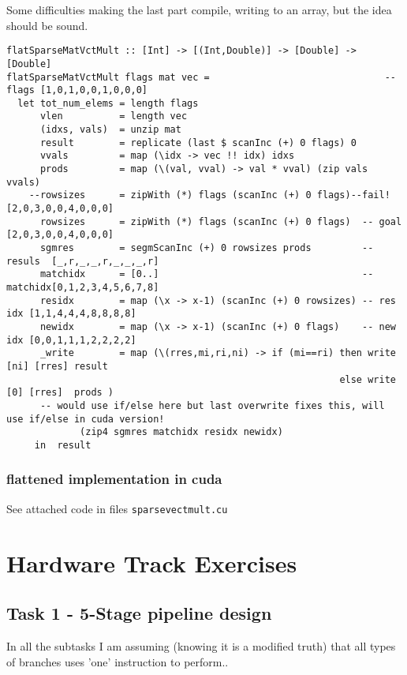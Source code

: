 \documentclass[a4paper,10pt]{article}
\begin{document}
Some difficulties making the last part compile, writing to an array, but the idea should be sound.
\begin{verbatim}
flatSparseMatVctMult :: [Int] -> [(Int,Double)] -> [Double] -> [Double]
flatSparseMatVctMult flags mat vec =                               -- flags [1,0,1,0,0,1,0,0,0]
  let tot_num_elems = length flags
      vlen          = length vec
      (idxs, vals)  = unzip mat
      result        = replicate (last $ scanInc (+) 0 flags) 0
      vvals         = map (\idx -> vec !! idx) idxs
      prods         = map (\(val, vval) -> val * vval) (zip vals vvals)
    --rowsizes      = zipWith (*) flags (scanInc (+) 0 flags)--fail!    [2,0,3,0,0,4,0,0,0]
      rowsizes      = zipWith (*) flags (scanInc (+) 0 flags)  -- goal    [2,0,3,0,0,4,0,0,0]
      sgmres        = segmScanInc (+) 0 rowsizes prods         -- resuls  [_,r,_,_,r,_,_,_,r]
      matchidx      = [0..]                                    -- matchidx[0,1,2,3,4,5,6,7,8]
      residx        = map (\x -> x-1) (scanInc (+) 0 rowsizes) -- res idx [1,1,4,4,4,8,8,8,8]
      newidx        = map (\x -> x-1) (scanInc (+) 0 flags)    -- new idx [0,0,1,1,1,2,2,2,2]
      _write        = map (\(rres,mi,ri,ni) -> if (mi==ri) then write [ni] [rres] result
                                                           else write [0] [rres]  prods )
      -- would use if/else here but last overwrite fixes this, will use if/else in cuda version!
             (zip4 sgmres matchidx residx newidx)
     in  result
\end{verbatim}

\subsubsection{flattened implementation in cuda}
See attached code in files \texttt{sparsevectmult.cu}







\newpage

\section{Hardware Track Exercises}
\subsection{Task 1 - 5-Stage pipeline design}
In all the subtasks I am assuming (knowing it is a modified truth) that all types of branches uses 'one' instruction to perform..
\end{document}
